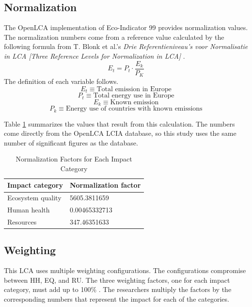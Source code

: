 \documentclass[final,journal,10pt,letterpaper,oneside,twocolumn,compsoc]%
{IEEEtran}
\begin{document}
\subsection{Normalization}
The OpenLCA implementation of Eco-Indicator 99 provides
normalization values. The normalization numbers come from a reference value
calculated by the following formula from T. Blonk et al.'s \textit{Drie
Referentieniveau's voor Normalisatie in LCA [Three Reference Levels for
Normalization in LCA]} \cite{blonk} \cite{pre-annex}. 
\begin{equation}
  E_t = P_t \cdot \frac{E_k}{P_K}
\end{equation}
The definition of each variable follows.
\begin{equation}
  E_t \equiv \textrm{Total emission in Europe}
\end{equation}
\begin{equation}
  P_t \equiv \textrm{Total energy use in Europe}
\end{equation}
\begin{equation}
  E_k \equiv \textrm{Known emission}
\end{equation}
\begin{equation}
  P_k \equiv \textrm{Energy use of countries with known emissions}
\end{equation}

Table \ref{tab:9} summarizes the values that result from this calculation. The
numbers come directly from the OpenLCA LCIA database, so this
study uses the same number of significant figures as the database.

\begin{table}[t!]
  \caption{Normalization Factors for Each Impact Category}
  \label{tab:9}
  \centering
    \begin{tabular}{| l | l |}
      \hline
      Impact category   & Normalization factor \\
      \hline
      Ecosystem quality & 5605.3811659 \\
      Human health      & 0.00465332713 \\
      Resources         & 347.46351633 \\
      \hline
    \end{tabular}
\end{table}

\subsection{Weighting}
This LCA uses multiple weighting configurations. The configurations compromise
between HH, EQ, and RU.
The three weighting factors, one for each impact category, must add up to 100\%
\cite{triangle}.
The researchers multiply the factors by the corresponding numbers
that represent the impact for each of the categories.
\end{document}
